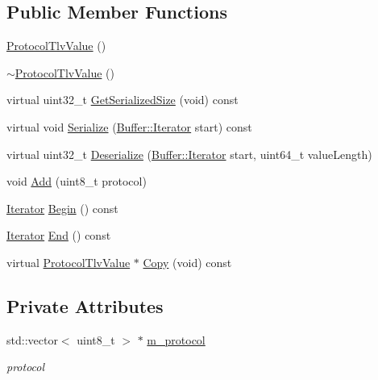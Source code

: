 \subsection*{Public Member Functions}
\begin{DoxyCompactItemize}
\item 
\hyperlink{classns3_1_1ProtocolTlvValue_a902749829058fdc2d4d01d175832500a}{Protocol\+Tlv\+Value} ()
\item 
\hyperlink{classns3_1_1ProtocolTlvValue_a96013d6a757ebbf82a5ab3cf991c3cac}{$\sim$\+Protocol\+Tlv\+Value} ()
\item 
virtual uint32\+\_\+t \hyperlink{classns3_1_1ProtocolTlvValue_a48b1bd41391382b58dd2c8a324cfd4a6}{Get\+Serialized\+Size} (void) const 
\item 
virtual void \hyperlink{classns3_1_1ProtocolTlvValue_a24fefe935054c55b2d6c3bad9da97abc}{Serialize} (\hyperlink{classns3_1_1Buffer_1_1Iterator}{Buffer\+::\+Iterator} start) const 
\item 
virtual uint32\+\_\+t \hyperlink{classns3_1_1ProtocolTlvValue_a1d1406c103f54e05e6cc42d82c3dab28}{Deserialize} (\hyperlink{classns3_1_1Buffer_1_1Iterator}{Buffer\+::\+Iterator} start, uint64\+\_\+t value\+Length)
\item 
void \hyperlink{classns3_1_1ProtocolTlvValue_a1c3ce061a89e07367671f56abd6d457e}{Add} (uint8\+\_\+t protocol)
\item 
\hyperlink{classns3_1_1ProtocolTlvValue_a83a87352f3acebc8d47c963d4f1936f0}{Iterator} \hyperlink{classns3_1_1ProtocolTlvValue_ad26b156210cf860bbf7be0eaa25f389b}{Begin} () const 
\item 
\hyperlink{classns3_1_1ProtocolTlvValue_a83a87352f3acebc8d47c963d4f1936f0}{Iterator} \hyperlink{classns3_1_1ProtocolTlvValue_a9d0439db6cb2eaf5d5de2f32b86912a8}{End} () const 
\item 
virtual \hyperlink{classns3_1_1ProtocolTlvValue}{Protocol\+Tlv\+Value} $\ast$ \hyperlink{classns3_1_1ProtocolTlvValue_ace43d35ce5f3d46b95344965e33743fd}{Copy} (void) const 
\end{DoxyCompactItemize}
\subsection*{Private Attributes}
\begin{DoxyCompactItemize}
\item 
std\+::vector$<$ uint8\+\_\+t $>$ $\ast$ \hyperlink{classns3_1_1ProtocolTlvValue_a16f3d8a6fc73343f52275304a5874b33}{m\+\_\+protocol}
\begin{DoxyCompactList}\small\item\em protocol \end{DoxyCompactList}\end{DoxyCompactItemize}



